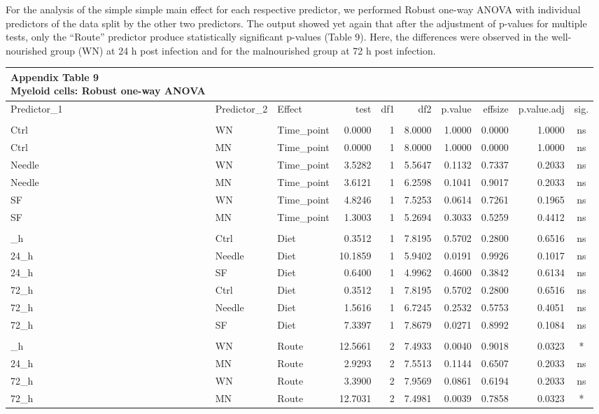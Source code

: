\documentclass[
  12pt,
  letterpaper,
]{article}
\begin{document}
For the analysis of the simple simple main effect for each respective predictor, we performed Robust one-way ANOVA with individual predictors of the data split by the other two predictors. The output showed yet again that after the adjustment of p-values for multiple tests, only the ``Route'' predictor produce statistically significant p-values (Table 9). Here, the differences were observed in the well-nourished group (WN) at 24 h post infection and for the malnourished group at 72 h post infection.

\begin{longtable}{lllrrrrrrc}
\caption*{
{\large \textbf{Appendix Table 9}} \\ 
{\small \textbf{Myeloid cells: Robust one-way ANOVA}}
} \\ 
\toprule
Predictor\_1 & Predictor\_2 & Effect & test & df1 & df2 & p.value & effsize & p.value.adj & sig. \\ 
\midrule\addlinespace[2.5pt]
\multicolumn{10}{l}{Predictor: Time\_point} \\ 
\midrule\addlinespace[2.5pt]
Ctrl & WN & Time\_point & 0.0000 & 1 & 8.0000 & 1.0000 & 0.0000 & 1.0000 & ns \\ 
Ctrl & MN & Time\_point & 0.0000 & 1 & 8.0000 & 1.0000 & 0.0000 & 1.0000 & ns \\ 
Needle & WN & Time\_point & 3.5282 & 1 & 5.5647 & 0.1132 & 0.7337 & 0.2033 & ns \\ 
Needle & MN & Time\_point & 3.6121 & 1 & 6.2598 & 0.1041 & 0.9017 & 0.2033 & ns \\ 
SF & WN & Time\_point & 4.8246 & 1 & 7.5253 & 0.0614 & 0.7261 & 0.1965 & ns \\ 
SF & MN & Time\_point & 1.3003 & 1 & 5.2694 & 0.3033 & 0.5259 & 0.4412 & ns \\ 
\midrule\addlinespace[2.5pt]
\multicolumn{10}{l}{Predictor: Diet} \\ 
\midrule\addlinespace[2.5pt]
24\_h & Ctrl & Diet & 0.3512 & 1 & 7.8195 & 0.5702 & 0.2800 & 0.6516 & ns \\ 
24\_h & Needle & Diet & 10.1859 & 1 & 5.9402 & 0.0191 & 0.9926 & 0.1017 & ns \\ 
24\_h & SF & Diet & 0.6400 & 1 & 4.9962 & 0.4600 & 0.3842 & 0.6134 & ns \\ 
72\_h & Ctrl & Diet & 0.3512 & 1 & 7.8195 & 0.5702 & 0.2800 & 0.6516 & ns \\ 
72\_h & Needle & Diet & 1.5616 & 1 & 6.7245 & 0.2532 & 0.5753 & 0.4051 & ns \\ 
72\_h & SF & Diet & 7.3397 & 1 & 7.8679 & 0.0271 & 0.8992 & 0.1084 & ns \\ 
\midrule\addlinespace[2.5pt]
\multicolumn{10}{l}{Predictor: Route} \\ 
\midrule\addlinespace[2.5pt]
24\_h & WN & Route & 12.5661 & 2 & 7.4933 & 0.0040 & 0.9018 & 0.0323 & * \\ 
24\_h & MN & Route & 2.9293 & 2 & 7.5513 & 0.1144 & 0.6507 & 0.2033 & ns \\ 
72\_h & WN & Route & 3.3900 & 2 & 7.9569 & 0.0861 & 0.6194 & 0.2033 & ns \\ 
72\_h & MN & Route & 12.7031 & 2 & 7.4981 & 0.0039 & 0.7858 & 0.0323 & * \\ 
\bottomrule
\end{longtable}
\end{document}
